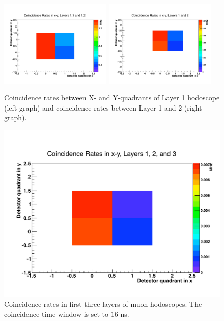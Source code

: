 \begin{figure}[htbp]
\begin{center}
\includegraphics[width=0.475\textwidth]{performance/trigger/muon_coinrate1}
\includegraphics[width=0.475\textwidth]{performance/trigger/muon_coinrate2}
\caption{Coincidence rates between X- and Y-quadrants of Layer 1 hodoscope (left graph) and coincidence rates between Layer 1 and 2 (right graph). }
\label{fig:c1rates}
\end{center}
\end{figure}

\begin{figure}[htbp]
\begin{center}
\includegraphics[width=\textwidth]{performance/trigger/muon_coinrate3}
\caption{Coincidence rates in first three layers of muon hodoscopes. The coincidence time window is set to $16$ ns. }
\label{fig:c3rates}
\end{center}
\end{figure}





